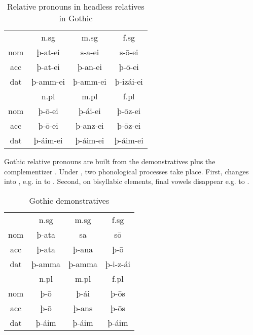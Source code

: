 \begin{table}[H]
	\center
	\caption {Relative pronouns in headless relatives in Gothic}
		\begin{tabular}{cccc}
		\toprule
							& \ac{n}.\ac{sg} 	& \ac{m}.\ac{sg}	& \ac{f}.\ac{sg}  \\
		 						\cmidrule{2-4}
    \ac{nom} 	& þ-at-ei 	 			& s-a-ei 					& s-ō-ei					\\
    \ac{acc}	& þ-at-ei    			& þ-an-ei  				& þ-ō-ei  				\\
    \ac{dat} 	& þ-amm-ei 				& þ-amm-ei				& þ-izái-ei 			\\
		\bottomrule
    					& \ac{n}.\ac{pl}	& \ac{m}.\ac{pl}	& \ac{f}.\ac{pl}	\\
						    \cmidrule{2-4}
    \ac{nom} 	& þ-ō-ei					&	þ-ái-ei					&	þ-ōz-ei					\\
    \ac{acc} 	& þ-ō-ei 					&	þ-anz-ei				&	þ-ōz-ei					\\
    \ac{dat} 	& þ-áim-ei				&	þ-áim-ei 				&	þ-áim-ei 				\\
    \bottomrule
		\end{tabular}
\end{table}

Gothic relative pronouns are built from the demonstratives plus the complementizer . Under , two phonological processes take place. First,  changes into , e.g. in  to . Second, on bisyllabic elements, final vowels disappear e.g.  to .

\begin{table}[H]
	\center
	\caption {Gothic demonstratives}
		\begin{tabular}{cccc}
		\toprule
							& \ac{n}.\ac{sg} 	& \ac{m}.\ac{sg}	& \ac{f}.\ac{sg}  \\
		 						\cmidrule{2-4}
    \ac{nom} 	& þ-ata 	 			  & sa  			  		& sō		    			\\
    \ac{acc}	& þ-ata    	   		& þ-ana  	  	 		& þ-ō     				\\
    \ac{dat} 	& þ-amma 		   		& þ-amma  				& þ-i-z-ái  			\\
		\bottomrule
    					& \ac{n}.\ac{pl}	& \ac{m}.\ac{pl}	& \ac{f}.\ac{pl}	\\
						    \cmidrule{2-4}
    \ac{nom} 	& þ-ō		     			&	þ-ái   					&	þ-ōs	  				\\
    \ac{acc} 	& þ-ō    					&	þ-ans   				&	þ-ōs	   				\\
    \ac{dat} 	& þ-áim   				&	þ-áim    				&	þ-áim   				\\
    \bottomrule
		\end{tabular}
\end{table}


